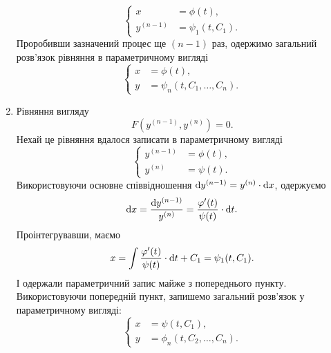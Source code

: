 \begin{enumerate}
\begin{equation*}
	\left\{
		\begin{aligned}
			x &= \phi(t), \\
			y^{(n-1)} &= \psi_1(t, C_1).
		\end{aligned}
	\right.
\end{equation*}
Проробивши зазначений процес ще $(n-1)$ раз, одержимо загальний розв’язок рівняння в параметричному вигляді
\begin{equation*}
	\left\{
		\begin{aligned}
			x &= \phi(t), \\
			y &= \psi_n(t, C_1, \ldots, C_n).
		\end{aligned}
	\right.
\end{equation*}
 
\item Рівняння вигляду
\begin{equation*}
	F \left( y^{(n-1)}, y^{(n)} \right) = 0.
\end{equation*}
Нехай це рівняння вдалося записати в параметричному вигляді 
\begin{equation*}
	\left\{
		\begin{aligned}
			y^{(n-1)} &= \phi(t), \\
			y^{(n)} &= \psi(t).
		\end{aligned}
	\right.
\end{equation*}
Використовуючи основне співвідношення $\mathop{}\!\mathrm{d} y^{(n-1)} = y^{(n)} \cdot \mathop{}\!\mathrm{d} x$, одержуємо
\begin{equation*}
	\mathop{}\!\mathrm{d} x = \frac{\mathop{}\!\mathrm{d} y^{(n-1)}}{y^{(n)}} = \frac{\varphi'(t)}{\psi(t)} \cdot \mathop{}\!\mathrm{d} t.
\end{equation*}
Проінтегрувавши, маємо
\begin{equation*}
	x = \int \frac{\varphi'(t)}{\psi(t)} \cdot \mathop{}\!\mathrm{d} t + C_1 = \psi_1(t, C_1).
\end{equation*}
І одержали параметричний запис майже з попереднього пункту. \\

Використовуючи попередній пункт, запишемо загальний розв’язок у параметричному вигляді:
\begin{equation*}
	\left\{
		\begin{aligned}
			x &= \psi(t, C_1), \\
			y &= \phi_n(t, C_2, \ldots, C_n).
		\end{aligned}
	\right.
\end{equation*}
 

\end{enumerate}
